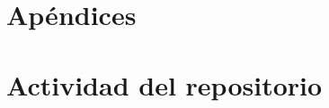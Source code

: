\documentclass[11pt, a4paper, twoside]{report}
\begin{document}
	\newpage
	\section{Apéndices}
		\appendix
		\section{Actividad del repositorio}
			
		
		\newpage
		\normalsize
		\nocite{PSMAN}
		
		
\end{document}
